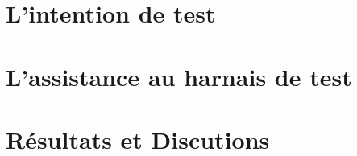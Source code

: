\documentclass[
10pt, %
a4paper, %
oneside, %
headinclude,footinclude, %
BCOR5mm, %
]{scrartcl}
\begin{document}
\lipsum[5] %

\newpage 
\section{L'intention de test}

\lipsum[5] %

\newpage 
\section{L'assistance au harnais de test}

\lipsum[5] %


\newpage 
\section{Résultats et Discutions}



\lipsum[10] %



\renewcommand{\refname}{\spacedlowsmallcaps{References}} %
\newpage 



\end{document}
